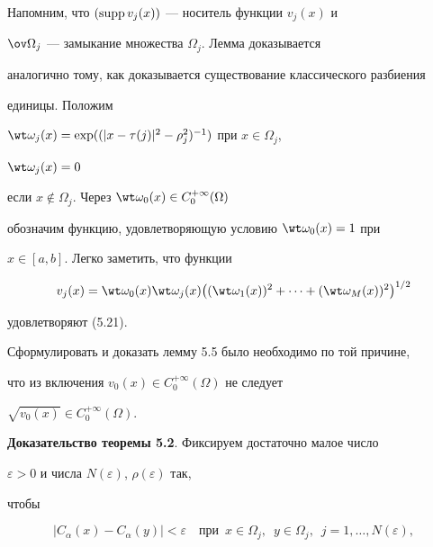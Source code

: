  


\begin{pf} 


Напомним, что $(\operatorname{supp} v_j(x))$ --- носитель функции $v_j(x)$ и 


$\ov\Omega_j$ --- замыкание множества $\Omega_j$. Лемма доказывается 


аналогично тому, как доказывается существование классического разбиения 


единицы. Положим 


$\wt\omega_j(x)=\exp((|x-\tau(j)|^2-\rho^2_j)^{-1})$ при $x\in\Omega_j$, 


$\wt\omega_j(x)=0$


если $x\notin\Omega_j$. Через $\wt\omega_0(x)\in C^{+\infty}_0(\Omega)$ 


обозначим функцию, удовлетворяющую условию $\wt\omega_0(x)=1$ при 


$x\in[a,b]$. Легко заметить, что функции 


$$ 


v_j(x)=\wt\omega_0(x)\wt\omega_j(x)\big((\wt\omega_1(x))^2+ 


\dotsb+(\wt\omega_M(x))^2\big)^{1/2} 


$$ 


удовлетворяют (5.21). 


\end{pf} 


 


\begin{notes} 


Сформулировать и доказать лемму 5.5 было необходимо по той причине, 


что из включения $v_0(x)\in C^{+\infty}_0(\Omega)$ не следует 


$\sqrt{v_0(x)}\in C^{+\infty}_0(\Omega)$. 


\end{notes} 


 


{\bf Доказательство теоремы 5.2}. Фиксируем достаточно малое число 


$\varepsilon>0$ и числа $N(\varepsilon)$, $\rho(\varepsilon)$ так, 


чтобы 


\begin{equation} 


|C_\alpha(x)-C_\alpha(y)|<\varepsilon\quad 


\text{при}\ \; x\in\Omega_j,\ \; y\in\Omega_j,\ \; 


j=1,\dotsc,N(\varepsilon), 


\end{equation} 


